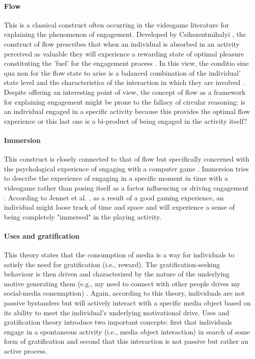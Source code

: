 \paragraph*{Flow} This is a classical construct often occurring in the videogame literature for explaining the phenomenon of engagement. Developed by Csikszentmihalyi \cite{csikszentmihalyi2014toward}, the construct of flow prescribes that when an individual is absorbed in an activity perceived as valuable they will experience a rewarding state of optimal pleasure constituting the 'fuel' for the engagement process \cite{boyle2012engagement}. In this view, the conditio sine qua non for the flow state to arise is a balanced combination of the individual’ state level and the characteristics of the interaction in which they are involved \cite{boyle2012engagement,csikszentmihalyi2014toward}. Despite offering an interesting point of view, the concept of flow as a framework for explaining engagement might be prone to the fallacy of circular reasoning: is an individual engaged in a specific activity because this provides the optimal flow experience or this last one is a bi-product of being engaged in the activity itself? 

\paragraph*{Immersion} This construct is closely connected to that of flow but specifically concerned with the psychological experience of engaging with a computer game \cite{jennett2008measuring}. Immersion tries to describe the experience of engaging in a specific moment in time with a videogame  rather than posing itself as a factor influencing or driving engagement \cite{jennett2008measuring}. According to Jennet et al. \cite{jennett2008measuring}, as a result of a good gaming experience, an individual might loose track of time and space and will experience a sense of being completely "immersed" in the playing activity.

\paragraph*{Uses and gratification} This theory states that the consumption of media is a way for individuals to satisfy the need for gratification (i.e., reward). The gratification-seeking behaviour is then driven and characterized by the nature of the underlying motive generating them (e.g., my need to connect with other people drives my social-media consumption) \cite{lucas2004sex}. Again, according to this theory, individuals are not passive bystanders but will actively interact with a specific media object based on its ability to meet the individual's underlying motivational drive. Uses and gratification theory introduce two important concepts: first that individuals engage in a spontaneous activity (i.e., media object interaction) in search of some form of gratification and second that this interaction is not passive but rather an active process.

